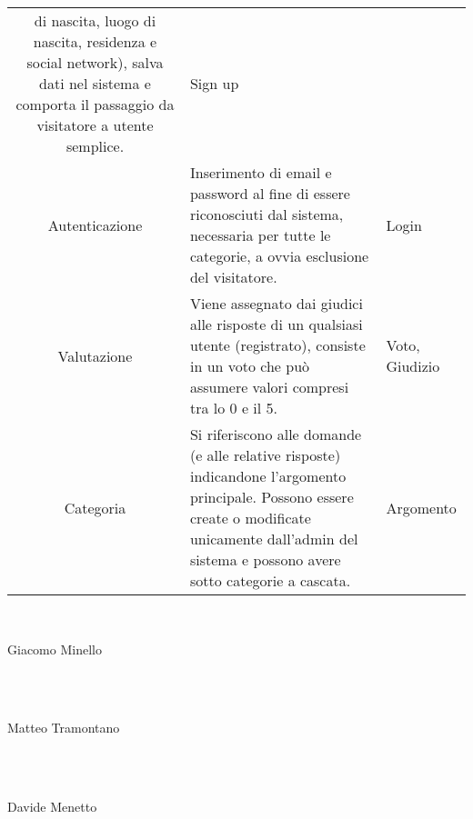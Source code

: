 \documentclass[paper=a4, fontsize=11pt]{scrartcl}
\numberwithin{equation}{section}		%
\numberwithin{figure}{section}			%
\numberwithin{table}{section}				%
\begin{document}
\begin{table}[H]
\begin{tabular}{c p{9cm} p{4cm} }
                                    di nascita, luogo di nascita, residenza e social network), salva 
                                    dati nel sistema e comporta il passaggio da visitatore a utente
                                    semplice. & Sign up\\
    Autenticazione & Inserimento di email e password al fine di essere riconosciuti dal     
                                    sistema, necessaria per tutte le categorie, a ovvia esclusione del
                                    visitatore.    & Login\\
    Valutazione & Viene assegnato dai giudici alle risposte di un qualsiasi utente       
                                    (registrato), consiste in un voto che può assumere valori compresi
                                    tra lo 0 e il 5.   & Voto, Giudizio\\
    Categoria & Si riferiscono alle domande (e alle relative risposte) indicandone    
                                    l'argomento principale. Possono essere create o modificate unicamente
                                    dall'admin del sistema e possono avere sotto categorie a cascata.         
               & Argomento\\
     \bottomrule
     \end{tabular}
    \end{table}
 
    

\\
\begin{flushright}
Giacomo Minello
\end{flushright}
\\~\\
\begin{flushright}
Matteo Tramontano
\end{flushright}
\\~\\
\begin{flushright}
Davide Menetto
\end{flushright}
\end{document}
